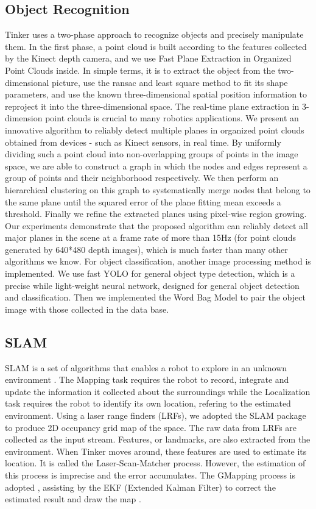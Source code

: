 \documentclass[runningheads,UTF8,fntef,a4paper]{llncs}
\begin{document}
\subsection{Object Recognition}
Tinker uses a two-phase approach to recognize objects and precisely manipulate them. In the first phase, a point cloud is built according to the features collected by the Kinect depth camera, and we use Fast Plane Extraction in Organized Point Clouds \cite{7866503} inside. In simple terms, it is to extract the object from the two-dimensional picture, use the ransac and least square method to fit its shape parameters, and use the known three-dimensional spatial position information to reproject it into the three-dimensional space. The real-time plane extraction in 3-dimension point clouds is crucial to many robotics applications. We present an innovative algorithm to reliably detect multiple planes in organized point clouds obtained from devices - such as Kinect sensors, in real time. By uniformly dividing such a point cloud into non-overlapping groups of points in the image space, we are able to construct a graph in which the nodes and edges represent a group of points and their neighborhood respectively. We then perform an hierarchical clustering on this graph to systematically merge nodes that belong to the same plane until the squared error of the plane fitting mean exceeds a threshold. Finally we refine the extracted planes using pixel-wise region growing. Our experiments demonstrate that the proposed algorithm can reliably detect all major planes in the scene at a frame rate of more than 15Hz (for point clouds generated by 640*480 depth images), which is much faster than many other algorithms we know.
For object classification, another image processing method is implemented. We use fast YOLO \cite{1612.08242} for general object type detection, which is a precise while light-weight neural network, designed for general object detection and classification. Then we implemented the Word Bag Model \cite{csurka2004visual} to pair the object image with those collected in the data base.

\subsection{SLAM}
SLAM is a set of algorithms that enables a robot to explore in an unknown environment \cite{grisetti2007improved}. The Mapping task requires the robot to record, integrate and update the information it collected about the surroundings while the Localization task requires the robot to identify its own location, refering to the estimated environment. Using a laser range finders (LRFs), we adopted the SLAM package to produce 2D occupancy grid map of the space. The raw data from LRFs are collected as the input stream. Features, or landmarks, are also extracted from the environment. When Tinker moves around, these features are used to estimate its location. It is called the Laser-Scan-Matcher process. However, the estimation of this process is imprecise and the error accumulates. The GMapping process is adopted \cite{1570477}, assisting by the EKF (Extended Kalman Filter) to correct the estimated result and draw the map \cite{Grisetti}.
\end{document}
